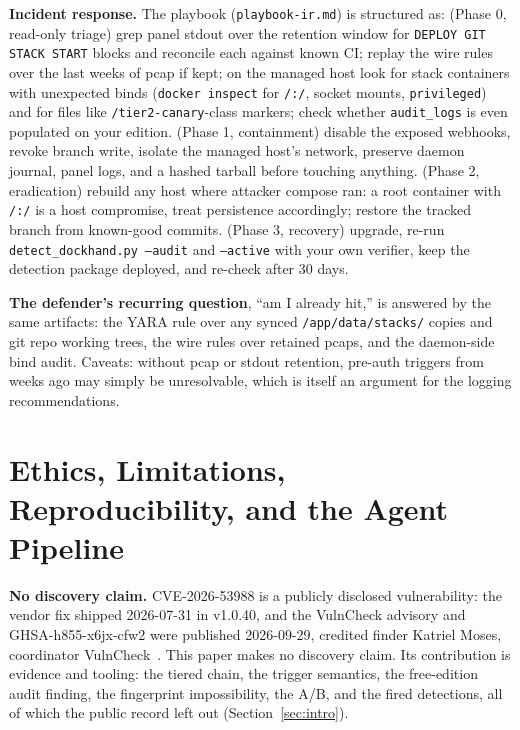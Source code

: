\documentclass[journal]{IEEEtran}
\begin{document}
\textbf{Incident response.} The playbook (\texttt{playbook-ir.md}) is
structured as: (Phase 0, read-only triage) grep panel stdout over the
retention window for \texttt{DEPLOY GIT STACK START} blocks and reconcile each
against known CI; replay the wire rules over the last weeks of pcap if kept;
on the managed host look for stack containers with unexpected binds
(\texttt{docker inspect} for \texttt{/:/}, socket mounts,
\texttt{privileged}) and for files like \texttt{/tier2-canary}-class markers;
check whether \texttt{audit\_logs} is even populated on your edition.
(Phase 1, containment) disable the exposed webhooks, revoke branch write,
isolate the managed host's network, preserve daemon journal, panel logs, and a
hashed tarball before touching anything. (Phase 2, eradication) rebuild any
host where attacker compose ran: a root container with \texttt{/:/} is a host
compromise, treat persistence accordingly; restore the tracked branch from
known-good commits. (Phase 3, recovery) upgrade, re-run
\texttt{detect\_dockhand.py --audit} and \texttt{--active}
with your own verifier, keep
the detection package deployed, and re-check after 30 days.

\textbf{The defender's recurring question}, ``am I already hit,'' is answered
by the same artifacts: the YARA rule over any synced
\texttt{/app/data/}\allowbreak\texttt{stacks/} copies and git repo working
trees, the wire rules over retained pcaps, and the daemon-side bind audit.
Caveats: without pcap or stdout retention, pre-auth triggers from weeks
ago may simply be unresolvable, which is itself an argument for the logging
recommendations.

\section{Ethics, Limitations, Reproducibility, and the Agent Pipeline}
\label{sec:ethics}

\textbf{No discovery claim.} CVE-2026-53988 is a publicly disclosed
vulnerability: the vendor fix shipped 2026-07-31 in v1.0.40, and the VulnCheck
advisory and GHSA-h855-x6jx-cfw2 were published 2026-09-29, credited finder
Katriel Moses, coordinator VulnCheck~\cite{cverecord,vulncheck,ghsa}. This
paper makes no discovery claim. Its contribution is evidence and tooling: the
tiered chain, the trigger semantics, the free-edition audit finding, the
fingerprint impossibility, the A/B, and the fired detections, all of which the
public record left out (Section~\ref{sec:intro}).
\end{document}
